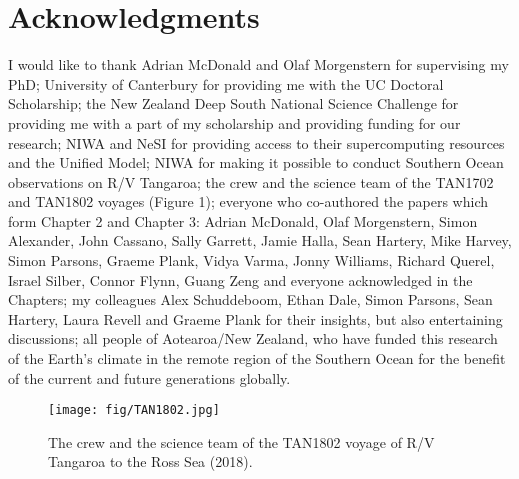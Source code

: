 \chapter*{Acknowledgments}

I would like to thank
Adrian McDonald and Olaf Morgenstern for supervising my PhD;
University of Canterbury for providing me with the UC Doctoral Scholarship;
the New Zealand Deep South National Science Challenge for providing me with a
part of my scholarship and providing funding for our research;
NIWA and NeSI for providing access to their supercomputing resources and the Unified Model;
NIWA for making it possible to conduct Southern Ocean observations on R/V
Tangaroa;
the crew and the science team of the TAN1702 and TAN1802 voyages (Figure 1);
everyone who co-authored the papers which form Chapter 2 and Chapter 3:
Adrian McDonald, Olaf Morgenstern, Simon Alexander, John Cassano,
Sally Garrett, Jamie Halla, Sean Hartery, Mike Harvey, Simon Parsons, Graeme Plank,
Vidya Varma, Jonny Williams, Richard Querel, Israel Silber, Connor Flynn, Guang Zeng
and everyone acknowledged in the Chapters;
my colleagues Alex Schuddeboom, Ethan Dale, Simon Parsons, Sean Hartery, Laura Revell and Graeme Plank for their insights, but also entertaining discussions;
all people of Aotearoa/New Zealand, who have funded this research of the Earth's climate
in the remote region of the Southern Ocean for the benefit of the current and
future generations globally.

\vfill

\begin{figure}[h]
\centering
\texttt{[image: fig/TAN1802.jpg]}
\caption{
The crew and the science team of the TAN1802 voyage of R/V Tangaroa
to the Ross Sea (2018).
}
\end{figure}
